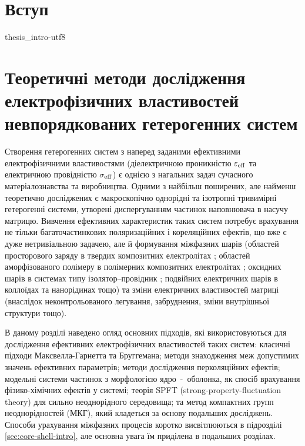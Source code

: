 \documentclass[14pt,twoside]{vakthesis}
\begin{document}
\chapter*{Вступ}

{thesis_intro-utf8}


\chapter{Теоретичні методи дослідження  електрофізичних властивостей невпорядкованих гетерогенних систем}\label{sec:overview}

Створення гетерогенних систем з наперед заданими ефективними електрофізичними властивостями (діелектричною проникністю $\varepsilon_{\rm eff}$ та електричною провідністю $\sigma_{\rm eff}$) є однією з нагальних задач сучасного матеріалознавства та виробництва.
Одними з найбільш поширених, але найменш теоретично досліджених є макроскопічно однорідні та ізотропні тривимірні гетерогенні системи, утворені диспергуванням частинок наповнювача в насучу матрицю. 
Вивчення ефективних характеристик таких систем потребує врахування не тільки багаточастинкових поляризаційних і кореляційних ефектів, що вже є дуже нетривіальною задачею, але й формування міжфазних шарів (областей просторового заряду в твердих композитних електролітах \cite{Dudney1988, NanC.-W.1991}; областей аморфізованого полімеру в полімерних композитних електролітах \cite{Przl1995,Wiec1994}; оксидних шарів в системах типу ізолятор--провідник \cite{Grannan1981,ChenI.-G.1986}; подвійних електричних шарів в коллоїдах та нанорідинах \cite{sarojini2013,Ohshima1982} тощо) та зміни електричних властивостей матриці (внаслідок неконтрольованого легування, забруднення, зміни внутрішньої структури тощо).

В даному розділі наведено огляд основних підходів, які використовуються для дослідження ефективних електрофізичних властивостей таких систем: класичні підходи Макс\-велла-Гарнетта та Бруггемана; методи знаходження меж допустимих значень ефективних параметрів; методи дослідження перколяційних ефектів; модельні системи частинок з морфологією ядро~-~оболонка, як спосіб врахування фізико-хімічних ефектів у системі; теорія SPFT (strong-property-fluctuation theory) для сильно неоднорідного середовища; та метод компактних групп неоднорідностей (МКГ), який кладеться за основу подальших досліджень.
Способи урахування міжфазних процесів коротко висвітлюються в підрозділі \ref{sec:core-shell-intro}, але основна увага їм приділена в подальших розділах.
\end{document}
